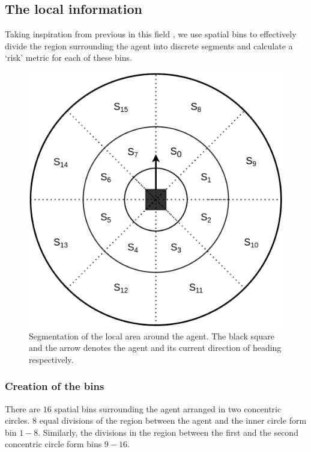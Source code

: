 \subsection*{The local information}
Taking inspiration from previous  in this field \cite{fahad_learning_2018} \cite{vasquez_inverse_2014}, we use spatial bins to effectively divide the region surrounding the agent into discrete segments and calculate a `risk' metric for each of these bins.
    \begin{figure}[htbp]
	\centering
	\includegraphics[width=0.5\linewidth]{figures/risk_features_spatial_bins.png}
	\caption{Segmentation of the local area around the agent. The black square and the arrow denotes the agent and its current direction of heading respectively.}
	\label{fig:risk_local_bins}
\end{figure}
\subsubsection*{Creation of the bins}
There are $16$ spatial bins surrounding the agent arranged in two concentric circles. $8$ equal divisions of the region between the agent and the inner circle form bin $1-8$. Similarly, the divisions in the region between the first and the second concentric circle form bins $9 - 16$.
